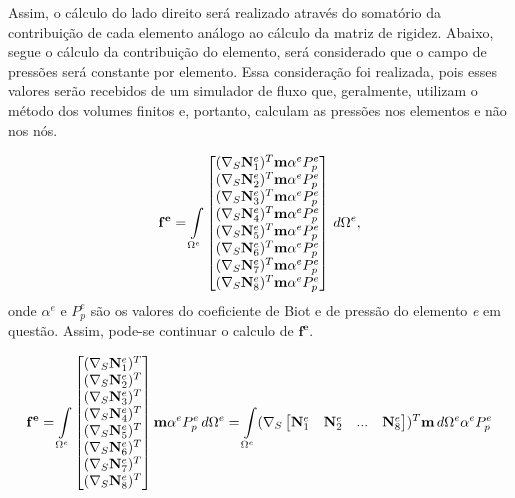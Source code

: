 Assim, o cálculo do lado direito será realizado através do somatório da contribuição de cada elemento análogo ao cálculo da matriz de rigidez. Abaixo, segue o cálculo da contribuição do elemento, será considerado que o campo de pressões será constante por elemento. Essa consideração foi realizada, pois esses valores serão recebidos de um simulador de fluxo que, geralmente, utilizam o método dos volumes finitos e, portanto, calculam as pressões nos elementos e não nos nós.

\begin{equation}
    \mathbf{f^e} = \omeeint{\begin{bmatrix}
(\sopnabla \basefunctionelem[1])^T \mathbf{m} \alpha^e P^e_p
\\
(\sopnabla \basefunctionelem[2])^T \mathbf{m} \alpha^e P^e_p
\\
(\sopnabla \basefunctionelem[3])^T \mathbf{m} \alpha^e P^e_p
\\
(\sopnabla \basefunctionelem[4])^T \mathbf{m} \alpha^e P^e_p
\\
(\sopnabla \basefunctionelem[5])^T \mathbf{m} \alpha^e P^e_p
\\
(\sopnabla \basefunctionelem[6])^T \mathbf{m} \alpha^e P^e_p
\\
(\sopnabla \basefunctionelem[7])^T \mathbf{m} \alpha^e P^e_p
\\
(\sopnabla \basefunctionelem[8])^T \mathbf{m} \alpha^e P^e_p
\end{bmatrix}},
\end{equation}
onde $\alpha^e$ e $P^e_p$ são os valores do coeficiente de Biot e de pressão do elemento \textit{e} em questão. Assim, pode-se continuar o calculo de $\mathbf{f^e}$.


\begin{equation}
\mathbf{f^e} = \omeeint{\begin{bmatrix}
(\sopnabla \basefunctionelem[1])^T
\\
(\sopnabla \basefunctionelem[2])^T
\\
(\sopnabla \basefunctionelem[3])^T
\\
(\sopnabla \basefunctionelem[4])^T
\\
(\sopnabla \basefunctionelem[5])^T
\\
(\sopnabla \basefunctionelem[6])^T
\\
(\sopnabla \basefunctionelem[7])^T
\\
(\sopnabla \basefunctionelem[8])^T
\end{bmatrix} \mathbf{m} \alpha^e P^e_p }
 = \omeeint{(\sopnabla  \begin{bmatrix} \basefunctionelem[1] & \basefunctionelem[2] & ... & \basefunctionelem[8]\end{bmatrix} )^T \mathbf{m}} \alpha^e P^e_p
\end{equation}

